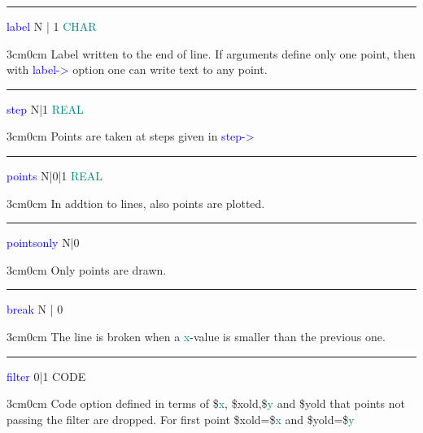 \vspace{0.3cm} 
\hrule 
\vspace{0.3cm} 
\noindent \textcolor{blue}{label}  \tabto{3cm}  N | 1  \tabto{5cm}   \textcolor{teal}{CHAR}  \tabto{7cm} 
\begin{changemargin}{3cm}{0cm} 
\noindent  Label written to the end of line. If arguments define only one point, 
then with \textcolor{blue}{label->} option one can write text to any point. 
\end{changemargin} 
\vspace{0.3cm} 
\hrule 
\vspace{0.3cm} 
\noindent \textcolor{blue}{step} \tabto{3cm} N|1 \tabto{5cm}  \textcolor{teal}{REAL} \tabto{7cm} 
\begin{changemargin}{3cm}{0cm} 
\noindent  Points are taken at steps given in \textcolor{blue}{step->} 
 
\end{changemargin} 
\vspace{0.3cm} 
\hrule 
\vspace{0.3cm} 
\noindent \textcolor{blue}{points}  \tabto{3cm} N|0|1 \tabto{5cm}  \textcolor{teal}{REAL} \tabto{7cm} 
\begin{changemargin}{3cm}{0cm} 
\noindent In addtion to lines, also points are plotted. 
\end{changemargin} 
\vspace{0.3cm} 
\hrule 
\vspace{0.3cm} 
\noindent \textcolor{blue}{pointsonly} \tabto{3cm} N|0 \tabto{5cm}   \tabto{7cm} 
\begin{changemargin}{3cm}{0cm} 
\noindent Only points are drawn. 
\end{changemargin} 
\vspace{0.3cm} 
\hrule 
\vspace{0.3cm} 
\noindent \textcolor{blue}{break}  \tabto{3cm}  N | 0  \tabto{5cm}    \tabto{7cm} 
\begin{changemargin}{3cm}{0cm} 
\noindent  The line is broken when a \textcolor{teal}{x}-value is smaller than the previous one. 
\end{changemargin} 
\vspace{0.3cm} 
\hrule 
\vspace{0.3cm} 
\noindent \textcolor{blue}{filter}  \tabto{3cm} 0|1  \tabto{5cm}  CODE  \tabto{7cm} 
\begin{changemargin}{3cm}{0cm} 
\noindent  Code option defined in terms of \$\textcolor{teal}{x}, \$xold,\$\textcolor{teal}{y} and \$yold that 
points not passing the filter are dropped. For first point \$xold=\$\textcolor{teal}{x} and \$yold=\$\textcolor{teal}{y} 
\end{changemargin} 
